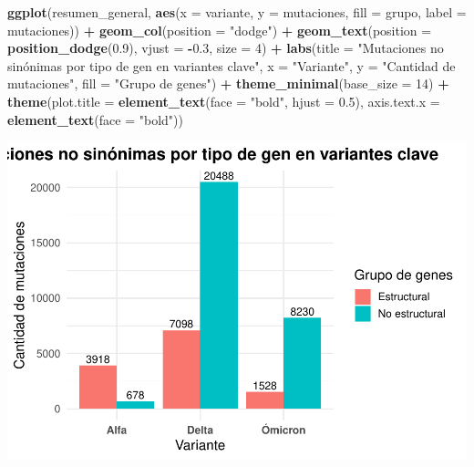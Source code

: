 \documentclass[
]{article}
\newenvironment{Shaded}{\begin{snugshade}}{\end{snugshade}}
\newcommand{\AttributeTok}[1]{\textcolor[rgb]{0.13,0.29,0.53}{#1}}
\newcommand{\DecValTok}[1]{\textcolor[rgb]{0.00,0.00,0.81}{#1}}
\newcommand{\FloatTok}[1]{\textcolor[rgb]{0.00,0.00,0.81}{#1}}
\newcommand{\FunctionTok}[1]{\textcolor[rgb]{0.13,0.29,0.53}{\textbf{#1}}}
\newcommand{\NormalTok}[1]{#1}
\newcommand{\SpecialCharTok}[1]{\textcolor[rgb]{0.81,0.36,0.00}{\textbf{#1}}}
\newcommand{\StringTok}[1]{\textcolor[rgb]{0.31,0.60,0.02}{#1}}
\begin{document}
\begin{Shaded}
\begin{Highlighting}[]
\FunctionTok{ggplot}\NormalTok{(resumen\_general, }\FunctionTok{aes}\NormalTok{(}\AttributeTok{x =}\NormalTok{ variante, }\AttributeTok{y =}\NormalTok{ mutaciones, }\AttributeTok{fill =}\NormalTok{ grupo, }\AttributeTok{label =}\NormalTok{ mutaciones)) }\SpecialCharTok{+}
  \FunctionTok{geom\_col}\NormalTok{(}\AttributeTok{position =} \StringTok{"dodge"}\NormalTok{) }\SpecialCharTok{+}
  \FunctionTok{geom\_text}\NormalTok{(}\AttributeTok{position =} \FunctionTok{position\_dodge}\NormalTok{(}\FloatTok{0.9}\NormalTok{), }\AttributeTok{vjust =} \SpecialCharTok{{-}}\FloatTok{0.3}\NormalTok{, }\AttributeTok{size =} \DecValTok{4}\NormalTok{) }\SpecialCharTok{+}
  \FunctionTok{labs}\NormalTok{(}\AttributeTok{title =} \StringTok{"Mutaciones no sinónimas por tipo de gen en variantes clave"}\NormalTok{,}
       \AttributeTok{x =} \StringTok{"Variante"}\NormalTok{, }\AttributeTok{y =} \StringTok{"Cantidad de mutaciones"}\NormalTok{, }\AttributeTok{fill =} \StringTok{"Grupo de genes"}\NormalTok{) }\SpecialCharTok{+}
  \FunctionTok{theme\_minimal}\NormalTok{(}\AttributeTok{base\_size =} \DecValTok{14}\NormalTok{) }\SpecialCharTok{+}
  \FunctionTok{theme}\NormalTok{(}\AttributeTok{plot.title =} \FunctionTok{element\_text}\NormalTok{(}\AttributeTok{face =} \StringTok{"bold"}\NormalTok{, }\AttributeTok{hjust =} \FloatTok{0.5}\NormalTok{),}
        \AttributeTok{axis.text.x =} \FunctionTok{element\_text}\NormalTok{(}\AttributeTok{face =} \StringTok{"bold"}\NormalTok{))}
\end{Highlighting}
\end{Shaded}

\includegraphics{situacion_problema_files/figure-latex/unnamed-chunk-5-1.pdf}
\end{document}
